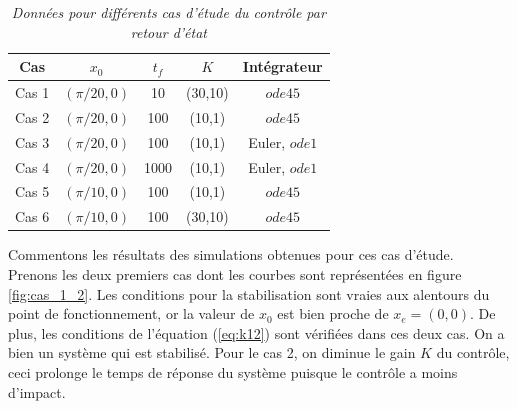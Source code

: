 \documentclass[11pt,french]{article} %
\begin{document}
\begin{table}[h!]
\centering
\begin{tabular}{|c c c c c|} 
 \hline
 Cas & $x_0$ & $t_f$ & $K$ & Intégrateur \\ [0.5ex] 
 \hline\hline
 Cas 1 & $(\pi/20,0)$ & 10 & (30,10) & $ode45$ \\ 
 Cas 2 & $(\pi/20,0)$ & 100 & (10,1) & $ode45$ \\
 Cas 3 & $(\pi/20,0)$ & 100 & (10,1) & Euler, $ode1$ \\
 Cas 4 & $(\pi/20,0)$ & 1000 & (10,1) & Euler, $ode1$ \\
 Cas 5 & $(\pi/10,0)$ & 100 & (10,1) & $ode45$ \\ 
 Cas 6 & $(\pi/10,0)$ & 100 & (30,10) & $ode45$ \\ [1ex] 
 \hline
\end{tabular}
\caption{\textit{Données pour différents cas d'étude du contrôle par retour d'état}}
\label{table:1}
\end{table} 

Commentons les résultats des simulations obtenues pour ces cas d'étude. \\

Prenons les deux premiers cas dont les courbes sont représentées en figure \ref{fig:cas_1_2}. Les conditions pour la stabilisation sont vraies aux alentours du point de fonctionnement, or la valeur de $x_0$ est bien proche de $x_e=(0,0)$. De plus, les conditions de l'équation (\ref{eq:k12}) sont vérifiées dans ces deux cas. On a bien un système qui est stabilisé. Pour le cas 2, on diminue le gain $K$ du contrôle, ceci prolonge le temps de réponse du système puisque le contrôle a moins d'impact. \\
\end{document}
